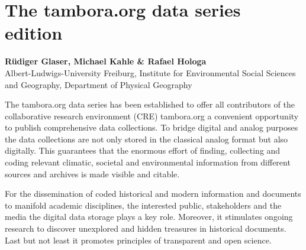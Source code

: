 \chapter*{The tambora.org data series edition}
\textbf{Rüdiger Glaser, Michael Kahle \& Rafael Hologa}\\
Albert-Ludwigs-University Freiburg, Institute for Environmental Social Sciences and Geography, Department of Physical Geography
\vspace{0.75cm}

The tambora.org data series has been established to offer all contributors of the collaborative research environment (CRE) tambora.org a convenient opportunity to publish comprehensive data collections. To bridge digital and analog purposes the data collections are not only stored in the classical analog format but also digitally. This guarantees that the enormous effort of finding, collecting and coding relevant climatic, societal and environmental information from different sources and archives is made visible and citable.

For the dissemination of coded historical and modern information and documents to manifold academic disciplines, the interested public, stakeholders and the media the digital data storage plays a key role. Moreover, it stimulates ongoing research to discover unexplored and hidden treasures in historical documents. Last but not least it promotes principles of transparent and open science.

